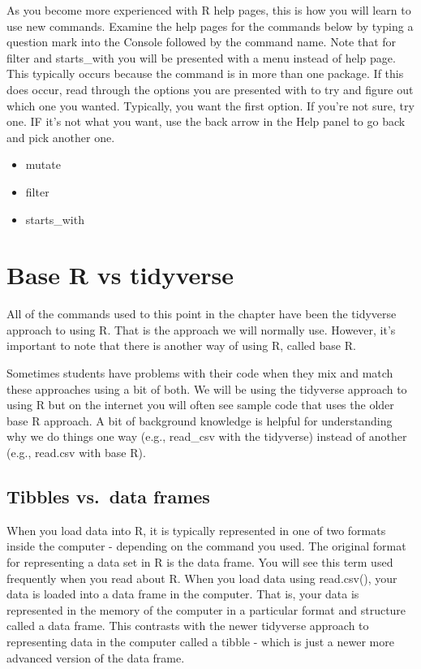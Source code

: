 \documentclass[
]{krantz}
\providecommand{\tightlist}{%
  \setlength{\itemsep}{0pt}\setlength{\parskip}{0pt}}
\begin{document}
As you become more experienced with R help pages, this is how you will learn to use new commands. Examine the help pages for the commands below by typing a question mark into the Console followed by the command name. Note that for filter and starts\_with you will be presented with a menu instead of help page. This typically occurs because the command is in more than one package. If this does occur, read through the options you are presented with to try and figure out which one you wanted. Typically, you want the first option. If you're not sure, try one. IF it's not what you want, use the back arrow in the Help panel to go back and pick another one.

\begin{itemize}
\tightlist
\item
  mutate
\item
  filter
\item
  starts\_with
\end{itemize}

\hypertarget{base-r-vs-tidyverse}{%
\section{Base R vs tidyverse}\label{base-r-vs-tidyverse}}

All of the commands used to this point in the chapter have been the tidyverse approach to using R. That is the approach we will normally use. However, it's important to note that there is another way of using R, called base R.

Sometimes students have problems with their code when they mix and match these approaches using a bit of both. We will be using the tidyverse approach to using R but on the internet you will often see sample code that uses the older base R approach. A bit of background knowledge is helpful for understanding why we do things one way (e.g., read\_csv with the tidyverse) instead of another (e.g., read.csv with base R).

\hypertarget{tibbles-vs.-data-frames}{%
\subsection{Tibbles vs.~data frames}\label{tibbles-vs.-data-frames}}

When you load data into R, it is typically represented in one of two formats inside the computer - depending on the command you used. The original format for representing a data set in R is the data frame. You will see this term used frequently when you read about R. When you load data using read.csv(), your data is loaded into a data frame in the computer. That is, your data is represented in the memory of the computer in a particular format and structure called a data frame. This contrasts with the newer tidyverse approach to representing data in the computer called a tibble - which is just a newer more advanced version of the data frame.
\end{document}
